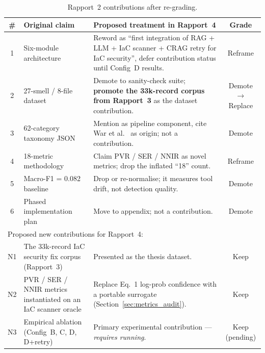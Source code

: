 \documentclass[11pt, a4paper]{report}
\begin{document}
\begin{table}[H]
  \centering
  \caption{Rapport~2 contributions after re-grading.}
  \label{tab:regraded}
  \begin{tabularx}{\linewidth}{clXc}
    \toprule
    \textbf{\#} & \textbf{Original claim} & \textbf{Proposed treatment in Rapport~4}
    & \textbf{Grade} \\
    \midrule
    1 & Six-module architecture & Reword as ``first integration of RAG + LLM
        + IaC scanner + CRAG retry for IaC security'', defer contribution
        status until Config~D results. & \color{critorange}Reframe \\
    2 & 27-smell / 8-file dataset & Demote to sanity-check suite;
        \textbf{promote the 33k-record corpus from Rapport~3} as the
        dataset contribution. & \color{critred}Demote $\to$ Replace \\
    3 & 62-category taxonomy JSON & Mention as pipeline component, cite
        War et al.~\citep{war2025taxonomy} as origin; not a contribution.
        & \color{critred}Demote \\
    4 & 18-metric methodology & Claim PVR / SER / NNIR as novel metrics;
        drop the inflated ``18'' count. & \color{critorange}Reframe \\
    5 & Macro-F1 = 0.082 baseline & Drop or re-normalise; it measures
        tool drift, not detection quality. & \color{critred}Demote \\
    6 & Phased implementation plan & Move to appendix; not a contribution.
        & \color{critred}Demote \\
    \midrule
    \multicolumn{4}{l}{\small Proposed new contributions for Rapport~4:} \\
    N1 & The 33k-record IaC security fix corpus (Rapport~3) &
        Presented as the thesis dataset. & \color{critgreen}Keep \\
    N2 & PVR / SER / NNIR metrics instantiated on an IaC scanner oracle &
        Replace Eq.~1 log-prob confidence with a portable surrogate
        (Section~\ref{sec:metrics_audit}). & \color{critgreen}Keep \\
    N3 & Empirical ablation (Config~B, C, D, D+retry) &
        Primary experimental contribution --- \emph{requires running}. &
        \color{critgreen}Keep (pending) \\
    \bottomrule
  \end{tabularx}
\end{table}

\end{document}

